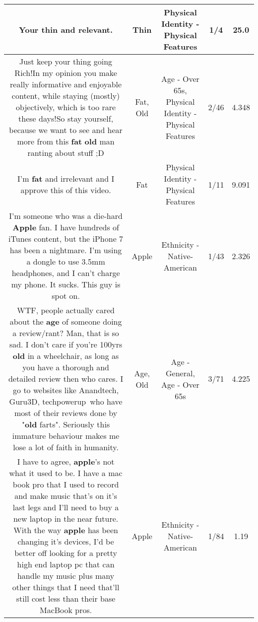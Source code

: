 \documentclass[11pt]{article}
\newlength\mylength
\begin{document}
\begin{center}
\begin{longtable}{|C{.65\mylength}|C{.30\mylength}|C{.12\mylength}|C{.12\mylength}|C{.12\mylength}|}
  \small Your \textbf{thin} and relevant.\normalsize   & Thin & Physical Identity - Physical Features & 1/4 & 25.0 \\  \hline
  \small Just keep your thing going Rich!In my opinion you make really informative and enjoyable content, while staying (mostly) objectively, which is too rare these days!So stay yourself, because we want to see and hear more from this \textbf{fat} \textbf{old} man ranting about stuff ;D\normalsize   & Fat, Old & Age - Over 65s, Physical Identity - Physical Features & 2/46 & 4.348 \\  \hline
  \small I'm \textbf{fat} and irrelevant and I approve this of this video.\normalsize   & Fat & Physical Identity - Physical Features & 1/11 & 9.091 \\  \hline
  \small I'm someone who was a die-hard \textbf{Apple} fan. I have hundreds of iTunes content, but the iPhone 7 has been a nightmare. I'm using a dongle to use 3.5mm headphones, and I can't charge my phone. It sucks. This guy is spot on.\normalsize   & Apple & Ethnicity - Native-American & 1/43 & 2.326 \\  \hline
  \small WTF, people actually cared about the \textbf{age} of someone doing a review/rant? Man, that is so sad. I don't care if you're 100yrs \textbf{old} in a wheelchair, as long as you have a thorough and detailed review then who cares.    I go to websites like Anandtech, Guru3D, techpowerup who have most of their reviews done by "\textbf{old} farts". Seriously this immature behaviour makes me lose a lot of faith in humanity.\normalsize   & Age, Old & Age - General, Age - Over 65s & 3/71 & 4.225 \\  \hline
  \small I have to agree, \textbf{apple}'s not what it used to be. I have a mac book pro that I used to record and make music that's on it's last legs and I'll need to buy a new laptop in the near future.  With the way \textbf{apple} has been changing it's devices, I'd be better off looking for a pretty high end laptop pc that can handle my music plus many other things that I need that'll still cost less than their base MacBook pros.\normalsize   & Apple & Ethnicity - Native-American & 1/84 & 1.19 \\  \hline

\end{longtable}
\end{center}
\end{document}
